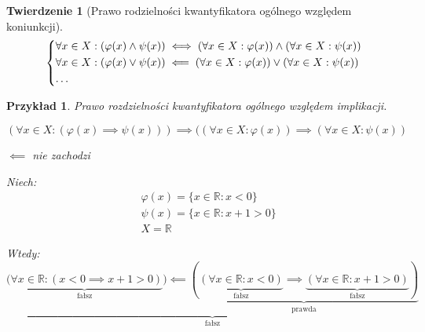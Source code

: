 \documentclass[a5paper,8pt]{article}
\theoremstyle{mythmstyle}
\newtheorem{theorem}{Twierdzenie}[section]
\newtheorem*{example}{Przykład}
\begin{document}
            \begin{theorem}[Prawo rodzielności kwantyfikatora ogólnego względem koniunkcji]

                \[
                    \begin{dcases*}
                    \forall x \in X : (\varphi(x) \wedge \psi(x)) \iff (\forall x \in X : \varphi(x)) \wedge (\forall x \in X : \psi(x)) \\
                    \forall x \in X : (\varphi(x) \vee \psi(x)) \impliedby (\forall x \in X : \varphi(x)) \vee (\forall x \in X : \psi(x)) \\
                    \ldots
                    \end{dcases*}
                \]

            \end{theorem}

            \begin{example}
                Prawo rozdzielności kwantyfikatora ogólnego względem implikacji.

                \begin{equation*}
                    (\forall x \in X : ( \varphi(x) \implies \psi(x))) \implies ((\forall x \in X : \varphi(x)) \implies (\forall x \in X : \psi(x))
                \end{equation*}

                \begin{center}
                    $ \impliedby $ nie zachodzi
                \end{center}

                Niech:
                \begin{equation*}
                    \begin{aligned}
                        & \varphi(x) = \{ x \in \mathbb{R} : x < 0 \} \\
                        & \psi(x) = \{ x \in \mathbb{R} : x + 1 > 0 \} \\
                        & X = \mathbb{R}
                    \end{aligned}
                \end{equation*}

                Wtedy:
                \begin{equation*}
                    \underbrace{\underbrace{(\forall x \in \mathbb{R} : (x < 0 \implies x + 1 > 0 )}_{\text{fałsz}})
                    \impliedby \underbrace{(\underbrace{(\forall x \in \mathbb{R} : x < 0)}_{\text{fałsz}} \implies \underbrace{(\forall x \in \mathbb{R} : x + 1 > 0)}_{\text{fałsz}})}_{\text{prawda}}}_{\text{fałsz}}
                \end{equation*}

            \end{example}
\end{document}
